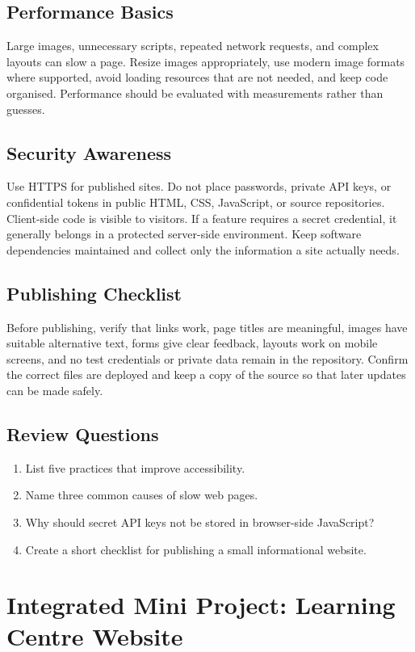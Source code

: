 \documentclass[11pt,openany,oneside]{book}
\begin{document}
\section{Performance Basics}
Large images, unnecessary scripts, repeated network requests, and complex layouts can slow a page. Resize images appropriately, use modern image formats where supported, avoid loading resources that are not needed, and keep code organised. Performance should be evaluated with measurements rather than guesses.

\section{Security Awareness}
Use HTTPS for published sites. Do not place passwords, private API keys, or confidential tokens in public HTML, CSS, JavaScript, or source repositories. Client-side code is visible to visitors. If a feature requires a secret credential, it generally belongs in a protected server-side environment. Keep software dependencies maintained and collect only the information a site actually needs.

\section{Publishing Checklist}
Before publishing, verify that links work, page titles are meaningful, images have suitable alternative text, forms give clear feedback, layouts work on mobile screens, and no test credentials or private data remain in the repository. Confirm the correct files are deployed and keep a copy of the source so that later updates can be made safely.

\section*{Review Questions}
\begin{enumerate}
\item List five practices that improve accessibility.
\item Name three common causes of slow web pages.
\item Why should secret API keys not be stored in browser-side JavaScript?
\item Create a short checklist for publishing a small informational website.
\end{enumerate}

\chapter{Integrated Mini Project: Learning Centre Website}
\end{document}
